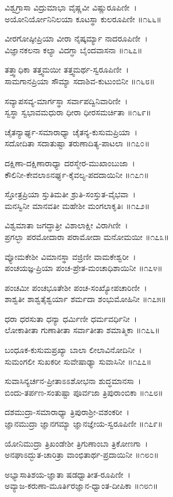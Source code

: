 ವಿಶ್ವಗ್ರಾಸಾ ವಿದ್ರುಮಾಭಾ ವೈಷ್ಣವೀ ವಿಷ್ಣುರೂಪಿಣೀ~।\\
ಅಯೋನಿರ್ಯೋನಿನಿಲಯಾ ಕೂಟಸ್ಥಾ ಕುಲರೂಪಿಣೀ ॥೧೬೬॥

ವೀರಗೋಷ್ಠೀಪ್ರಿಯಾ ವೀರಾ ನೈಷ್ಕರ್ಮ್ಯಾ  ನಾದರೂಪಿಣೀ~।\\
ವಿಜ್ಞಾನಕಲನಾ ಕಲ್ಯಾ ವಿದಗ್ಧಾ ಬೈಂದವಾಸನಾ ॥೧೬೭॥

ತತ್ತ್ವಾಧಿಕಾ ತತ್ತ್ವಮಯೀ ತತ್ತ್ವಮರ್ಥ-ಸ್ವರೂಪಿಣೀ~।\\
ಸಾಮಗಾನಪ್ರಿಯಾ ಸೌಮ್ಯಾ ಸದಾಶಿವ-ಕುಟುಂಬಿನೀ ॥೧೬೮॥

ಸವ್ಯಾಪಸವ್ಯ-ಮಾರ್ಗಸ್ಥಾ ಸರ್ವಾಪದ್ವಿನಿವಾರಿಣೀ~।\\
ಸ್ವಸ್ಥಾ ಸ್ವಭಾವಮಧುರಾ ಧೀರಾ ಧೀರಸಮರ್ಚಿತಾ ॥೧೬೯॥

ಚೈತನ್ಯಾರ್ಘ್ಯ-ಸಮಾರಾಧ್ಯಾ ಚೈತನ್ಯ-ಕುಸುಮಪ್ರಿಯಾ~।\\
ಸದೋದಿತಾ ಸದಾತುಷ್ಟಾ ತರುಣಾದಿತ್ಯ-ಪಾಟಲಾ ॥೧೭೦॥

ದಕ್ಷಿಣಾ-ದಕ್ಷಿಣಾರಾಧ್ಯಾ ದರಸ್ಮೇರ-ಮುಖಾಂಬುಜಾ~।\\
ಕೌಲಿನೀ-ಕೇವಲಾಽನರ್ಘ್ಯ-ಕೈವಲ್ಯ-ಪದದಾಯಿನೀ ॥೧೭೧॥

ಸ್ತೋತ್ರಪ್ರಿಯಾ ಸ್ತುತಿಮತೀ ಶ್ರುತಿ-ಸಂಸ್ತುತ-ವೈಭವಾ~।\\
ಮನಸ್ವಿನೀ ಮಾನವತೀ ಮಹೇಶೀ ಮಂಗಲಾಕೃತಿಃ ॥೧೭೨॥

ವಿಶ್ವಮಾತಾ ಜಗದ್ಧಾತ್ರೀ ವಿಶಾಲಾಕ್ಷೀ ವಿರಾಗಿಣೀ~।\\
ಪ್ರಗಲ್ಭಾ ಪರಮೋದಾರಾ ಪರಾಮೋದಾ ಮನೋಮಯೀ ॥೧೭೩॥

ವ್ಯೋಮಕೇಶೀ ವಿಮಾನಸ್ಥಾ ವಜ್ರಿಣೀ ವಾಮಕೇಶ್ವರೀ~।\\
ಪಂಚಯಜ್ಞ-ಪ್ರಿಯಾ ಪಂಚ-ಪ್ರೇತ-ಮಂಚಾಧಿಶಾಯಿನೀ ॥೧೭೪॥

ಪಂಚಮೀ ಪಂಚಭೂತೇಶೀ ಪಂಚ-ಸಂಖ್ಯೋಪಚಾರಿಣೀ~।\\
ಶಾಶ್ವತೀ ಶಾಶ್ವತೈಶ್ವರ್ಯಾ ಶರ್ಮದಾ ಶಂಭುಮೋಹಿನೀ ॥೧೭೫॥

ಧರಾ ಧರಸುತಾ ಧನ್ಯಾ ಧರ್ಮಿಣೀ ಧರ್ಮವರ್ಧಿನೀ~।\\
ಲೋಕಾತೀತಾ ಗುಣಾತೀತಾ ಸರ್ವಾತೀತಾ ಶಮಾತ್ಮಿಕಾ ॥೧೭೬॥

ಬಂಧೂಕ-ಕುಸುಮಪ್ರಖ್ಯಾ ಬಾಲಾ ಲೀಲಾವಿನೋದಿನೀ~।\\
ಸುಮಂಗಲೀ ಸುಖಕರೀ ಸುವೇಷಾಢ್ಯಾ ಸುವಾಸಿನೀ ॥೧೭೭॥

ಸುವಾಸಿನ್ಯರ್ಚನ-ಪ್ರೀತಾಽಽಶೋಭನಾ ಶುದ್ಧಮಾನಸಾ~।\\
ಬಿಂದು-ತರ್ಪಣ-ಸಂತುಷ್ಟಾ ಪೂರ್ವಜಾ ತ್ರಿಪುರಾಂಬಿಕಾ ॥೧೭೮॥

ದಶಮುದ್ರಾ-ಸಮಾರಾಧ್ಯಾ ತ್ರಿಪುರಾಶ್ರೀ-ವಶಂಕರೀ~।\\
ಜ್ಞಾನಮುದ್ರಾ ಜ್ಞಾನಗಮ್ಯಾ ಜ್ಞಾನಜ್ಞೇಯ-ಸ್ವರೂಪಿಣೀ ॥೧೭೯॥

ಯೋನಿಮುದ್ರಾ ತ್ರಿಖಂಡೇಶೀ ತ್ರಿಗುಣಾಂಬಾ ತ್ರಿಕೋಣಗಾ~।\\
ಅನಘಾಽದ್ಭುತ-ಚಾರಿತ್ರಾ ವಾಂಛಿತಾರ್ಥ-ಪ್ರದಾಯಿನೀ ॥೧೮೦॥

ಅಭ್ಯಾಸಾತಿಶಯ-ಜ್ಞಾತಾ ಷಡಧ್ವಾತೀತ-ರೂಪಿಣೀ~।\\
ಅವ್ಯಾಜ-ಕರುಣಾ-ಮೂರ್ತಿರಜ್ಞಾನ-ಧ್ವಾಂತ-ದೀಪಿಕಾ ॥೧೮೧॥


